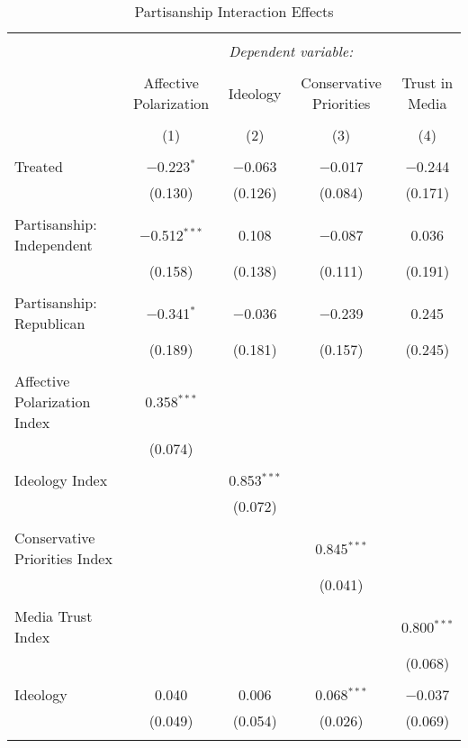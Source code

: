 
\begin{table}[!htbp] \centering 
  \caption{Partisanship Interaction Effects} 
  \label{} 
\tiny 
\begin{tabular}{@{\extracolsep{5pt}}lcccc} 
\\[-1.8ex]\hline 
\hline \\[-1.8ex] 
 & \multicolumn{4}{c}{\textit{Dependent variable:}} \\ 
\cline{2-5} 
\\[-1.8ex] & Affective Polarization & Ideology & Conservative Priorities & Trust in Media \\ 
\\[-1.8ex] & (1) & (2) & (3) & (4)\\ 
\hline \\[-1.8ex] 
 Treated & $-$0.223$^{*}$ & $-$0.063 & $-$0.017 & $-$0.244 \\ 
  & (0.130) & (0.126) & (0.084) & (0.171) \\ 
  & & & & \\ 
 Partisanship: Independent & $-$0.512$^{***}$ & 0.108 & $-$0.087 & 0.036 \\ 
  & (0.158) & (0.138) & (0.111) & (0.191) \\ 
  & & & & \\ 
 Partisanship: Republican & $-$0.341$^{*}$ & $-$0.036 & $-$0.239 & 0.245 \\ 
  & (0.189) & (0.181) & (0.157) & (0.245) \\ 
  & & & & \\ 
 Affective Polarization Index & 0.358$^{***}$ &  &  &  \\ 
  & (0.074) &  &  &  \\ 
  & & & & \\ 
 Ideology Index &  & 0.853$^{***}$ &  &  \\ 
  &  & (0.072) &  &  \\ 
  & & & & \\ 
 Conservative Priorities Index &  &  & 0.845$^{***}$ &  \\ 
  &  &  & (0.041) &  \\ 
  & & & & \\ 
 Media Trust Index &  &  &  & 0.800$^{***}$ \\ 
  &  &  &  & (0.068) \\ 
  & & & & \\ 
 Ideology & 0.040 & 0.006 & 0.068$^{***}$ & $-$0.037 \\ 
  & (0.049) & (0.054) & (0.026) & (0.069) \\ 
  & & & & \\ 

\end{tabular}
\end{table}
